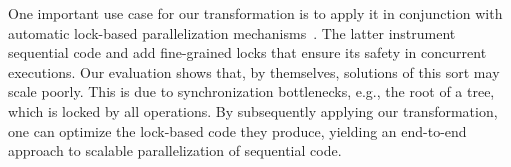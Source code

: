 One important use case for our transformation is to apply it in conjunction with automatic lock-based
parallelization mechanisms~\cite{Gueta2011,MZGB:POPL06}.
The latter instrument sequential code 
and add fine-grained locks
that ensure its safety in concurrent executions.
Our evaluation shows that, by themselves, solutions of this sort may scale poorly.
This is due to synchronization bottlenecks, e.g., the root of a tree,
which is locked by all operations.
By subsequently applying our transformation, one can optimize
the lock-based code they produce, yielding an end-to-end approach to
scalable parallelization of sequential code.


